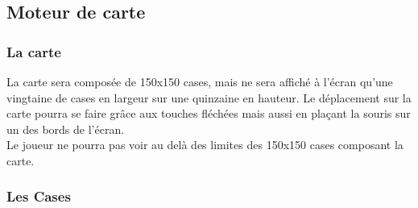 \documentclass[a4paper]{article}
\newcommand{\alinea}{\hspace*{0.5cm}}
\begin{document}
        
      \subsection{Moteur de carte}
    
        \subsubsection{La carte}

          \alinea La carte sera composée de 150x150 cases, mais ne sera affiché à l'écran qu'une vingtaine de cases en largeur sur une quinzaine en hauteur. Le déplacement sur la carte pourra se faire grâce aux touches fléchées mais aussi en plaçant la souris sur un des bords de l'écran.\\
          Le joueur ne pourra pas voir au delà des limites des 150x150 cases composant la carte.

        \subsubsection{Les Cases}
\end{document}
